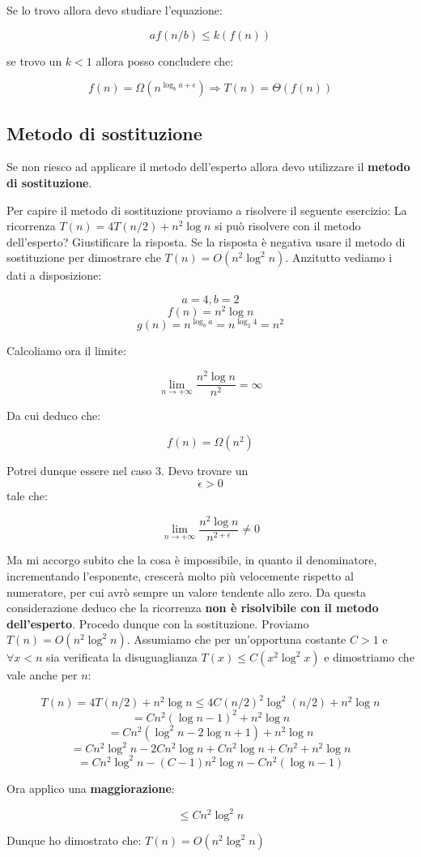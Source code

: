 Se lo trovo allora devo studiare l'equazione:

$$af(n/b)\le k(f(n))$$

se trovo un $k<1$ allora posso concludere che:

$$f(n)=\Omega(n^{\log_ba+\epsilon})\Rightarrow T(n)=\Theta(f(n))$$

\subsection{Metodo di sostituzione}

Se non riesco ad applicare il metodo dell'esperto allora devo utilizzare il \textbf{metodo di sostituzione}.

Per capire il metodo di sostituzione proviamo a risolvere il seguente esercizio:
\linebreak
\linebreak
La ricorrenza $T(n)=4T(n/2)+n^2\log n$ si può risolvere con il metodo dell'esperto? Giustificare la risposta. Se la risposta è negativa usare il metodo di sostituzione per dimostrare che $T(n)=O(n^2\log^2n)$.
\linebreak
\linebreak
Anzitutto vediamo i dati a disposizione:

$$a = 4, b = 2$$ 
$$f(n)=n^2\log n$$
$$g(n)=n^{\log_{b}a}=n^{\log_{2}4}=n^2$$

Calcoliamo ora il limite:

$$\lim_{n \to +\infty}\frac{n^2\log n}{n^2}=\infty$$

Da cui deduco che:

$$f(n)=\Omega(n^2)$$

Potrei dunque essere nel caso 3. Devo trovare un $$\epsilon > 0$$  tale che:

$$\lim_{n \to +\infty}\frac{n^2\log n}{n^{2+\epsilon}}\neq0$$

Ma mi accorgo subito che la cosa è impossibile, in quanto il denominatore, incrementando l'esponente, crescerà molto più velocemente rispetto al numeratore, per cui avrò sempre un valore tendente allo zero. Da questa considerazione deduco che la ricorrenza \textbf{non è risolvibile con il metodo dell'esperto}.
\linebreak
\linebreak
Procedo dunque con la sostituzione. Proviamo $T(n)=O(n^2\log^2n)$. Assumiamo che per un'opportuna costante $C>1$ e $\forall x<n$ sia verificata la disuguaglianza $T(x)\le C(x^2\log^2x)$ e dimostriamo che vale anche per $n$:

$$T(n)=4T(n/2)+n^2\log n \le 4C(n/2)^2\log^2(n/2)+n^2\log n$$
$$=Cn^2(\log n -1)^2+n^2\log n$$
$$=Cn^2(\log^2n-2\log n+1)+n^2\log n$$
$$=Cn^2\log^2n-2Cn^2\log n +Cn^2\log n+Cn^2+n^2\log n$$
$$=Cn^2\log^2n-(C-1)n^2\log n-Cn^2(\log n -1)$$

Ora applico una \textbf{maggiorazione}:

$$\le Cn^2\log^2n$$

Dunque ho dimostrato che: $T(n)=O(n^2\log^2n)$